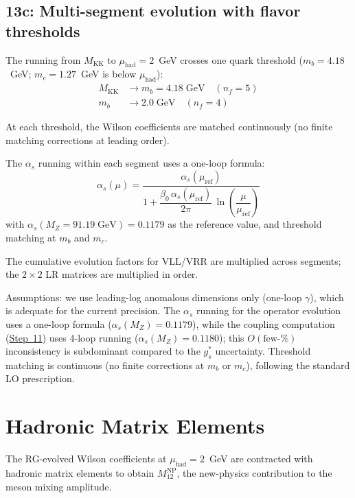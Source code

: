 \documentclass[11pt]{article}
\newcommand{\Mkk}{M_{\mathrm{KK}}}
\newcommand{\gs}{g_s^*}
\begin{document}
\subsection{13c: Multi-segment evolution with flavor thresholds}
\label{sec:step13c}

The running from $\Mkk$ to $\mu_{\mathrm{had}} = 2$~GeV crosses one quark
threshold ($m_b = 4.18$~GeV; $m_c = 1.27$~GeV is below $\mu_{\mathrm{had}}$):
\begin{align*}
  \Mkk &\longrightarrow m_b = 4.18\;\text{GeV} \quad (n_f = 5) \\
  m_b  &\longrightarrow 2.0\;\text{GeV} \quad (n_f = 4)
\end{align*}

At each threshold, the Wilson coefficients are matched continuously (no finite
matching corrections at leading order).

The $\alpha_s$ running within each segment uses a one-loop formula:
\begin{equation}
  \alpha_s(\mu) = \frac{\alpha_s(\mu_{\mathrm{ref}})}
    {1 + \dfrac{\beta_0\,\alpha_s(\mu_{\mathrm{ref}})}{2\pi}\,
    \ln\!\left(\dfrac{\mu}{\mu_{\mathrm{ref}}}\right)}
\end{equation}
with $\alpha_s(M_Z = 91.19\;\text{GeV}) = 0.1179$ as the reference value, and
threshold matching at $m_b$ and $m_c$.

The cumulative evolution factors for VLL/VRR are multiplied across segments;
the $2\times2$ LR matrices are multiplied in order.

Assumptions: we use leading-log anomalous dimensions only (one-loop $\gamma$),
which is adequate for the current precision. The $\alpha_s$ running for the
operator evolution uses a one-loop formula ($\alpha_s(M_Z) = 0.1179$), while
the coupling computation (\hyperref[sec:step11]{Step~11}) uses 4-loop running
($\alpha_s(M_Z) = 0.1180$); this $O(\text{few-\%})$ inconsistency is
subdominant compared to the $\gs$ uncertainty. Threshold matching is continuous
(no finite corrections at $m_b$ or $m_c$), following the standard LO
prescription.

\section{Hadronic Matrix Elements}
\label{sec:step14}

The RG-evolved Wilson coefficients at $\mu_{\mathrm{had}} = 2$~GeV are
contracted with hadronic matrix elements to obtain $M_{12}^{\mathrm{NP}}$, the
new-physics contribution to the meson mixing amplitude.
\end{document}
